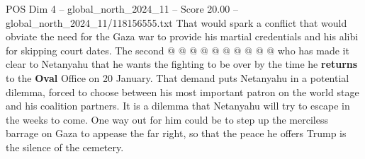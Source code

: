 \begin{textsample}{POS Dim 4 – global\_north\_2024\_11 – Score 20.00 – global\_north\_2024\_11/118156555.txt}
That would spark a conflict that would obviate the need for the Gaza war to provide his martial credentials and his alibi for skipping court dates.
The second @ @ @ @ @ @ @ @ @ @ who has made it clear to Netanyahu that he wants the fighting to be over by the time he \textbf{returns} to the \textbf{Oval} Office on 20 January.
That demand puts Netanyahu in a potential dilemma, forced to choose between his most important patron on the world stage and his coalition partners.
It is a dilemma that Netanyahu will try to escape in the weeks to come.
One way out for him could be to step up the merciless barrage on Gaza to appease the far right, so that the peace he offers Trump is the silence of the cemetery.

\end{textsample}
